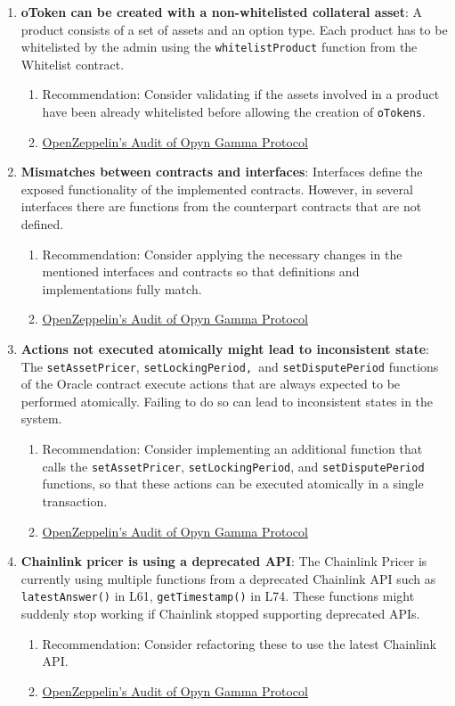 \begin{enumerate}
\item\textbf{oToken can be created with a non-whitelisted collateral asset}: A product consists of a set of assets and an option type. Each product has to be whitelisted by the admin using the \verb|whitelistProduct| function from the Whitelist contract.
	\begin{enumerate}
	\item Recommendation: Consider validating if the assets involved in a product have been already whitelisted before allowing the creation of \verb|oTokens|.
	\item\href{https://blog.openzeppelin.com/opyn-gamma-protocol-audit/}{OpenZeppelin's Audit of Opyn Gamma Protocol}
	\end{enumerate}

\item\textbf{Mismatches between contracts and interfaces}: Interfaces define the exposed functionality of the implemented contracts. However, in several interfaces there are functions from the counterpart contracts that are not defined.
	\begin{enumerate}
	\item Recommendation: Consider applying the necessary changes in the mentioned interfaces and contracts so that definitions and implementations fully match.
	\item\href{https://blog.openzeppelin.com/opyn-gamma-protocol-audit/}{OpenZeppelin's Audit of Opyn Gamma Protocol}
	\end{enumerate}

\item\textbf{Actions not executed atomically might lead to inconsistent state}: The \verb|setAssetPricer|, \verb|setLockingPeriod, |and \verb|setDisputePeriod| functions of the Oracle contract execute actions that are always expected to be performed atomically. Failing to do so can lead to inconsistent states in the system.
	\begin{enumerate}
	\item Recommendation: Consider implementing an additional function that calls the \verb|setAssetPricer|, \verb|setLockingPeriod|, and \verb|setDisputePeriod| functions, so that these actions can be executed atomically in a single transaction.
	\item\href{https://blog.openzeppelin.com/opyn-gamma-protocol-audit/}{OpenZeppelin's Audit of Opyn Gamma Protocol}
	\end{enumerate}

\item\textbf{Chainlink pricer is using a deprecated API}: The Chainlink Pricer is currently using multiple functions from a deprecated Chainlink API such as \verb|latestAnswer()| in L61, \verb|getTimestamp()| in L74. These functions might suddenly stop working if Chainlink stopped supporting deprecated APIs.
	\begin{enumerate}
	\item Recommendation: Consider refactoring these to use the latest Chainlink API.
	\item\href{https://blog.openzeppelin.com/opyn-gamma-protocol-audit/}{OpenZeppelin's Audit of Opyn Gamma Protocol}
	\end{enumerate}


\end{enumerate}
